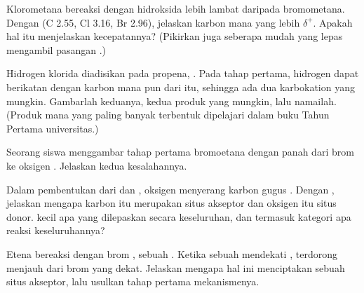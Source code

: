 \begin{exercise}[$\star\star$]\label{exo:g12:curly-arrows:11}
Klorometana bereaksi dengan  hidroksida lebih lambat daripada
bromometana. Dengan  (C 2.55, Cl 3.16, Br 2.96),
jelaskan karbon mana yang lebih $\delta^+$. Apakah hal itu menjelaskan
kecepatannya? (Pikirkan juga seberapa mudah  yang lepas mengambil
pasangan .)
\end{exercise}

\begin{exercise}[$\star\star\star$]\label{exo:g12:curly-arrows:12}
Hidrogen klorida diadisikan pada propena, . Pada tahap
pertama,  hidrogen dapat berikatan dengan karbon mana pun dari  itu, sehingga ada dua karbokation yang mungkin. Gambarlah
keduanya, kedua produk yang mungkin, lalu namailah. (Produk mana yang
paling banyak terbentuk dipelajari dalam buku Tahun Pertama
universitas.)
\end{exercise}

\begin{exercise}[$\star\star\star$]\label{exo:g12:curly-arrows:13}
Seorang siswa menggambar tahap pertama  bromoetana dengan
panah dari  brom ke oksigen . Jelaskan kedua kesalahannya.
\end{exercise}

\begin{exercise}[$\star\star\star$]\label{exo:g12:curly-arrows:14}
Dalam pembentukan  dari  dan , oksigen
 menyerang karbon gugus . Dengan ,
jelaskan mengapa karbon itu merupakan situs akseptor dan oksigen itu
situs donor.  kecil apa yang dilepaskan secara keseluruhan, dan
termasuk kategori apa reaksi keseluruhannya?
\end{exercise}

\begin{exercise}[$\star\star\star$]\label{exo:g12:curly-arrows:15}
Etena bereaksi dengan brom , sebuah . Ketika
sebuah   mendekati , 
 terdorong menjauh dari  brom yang dekat. Jelaskan
mengapa hal ini menciptakan sebuah situs akseptor, lalu usulkan tahap
pertama mekanismenya.
\end{exercise}

